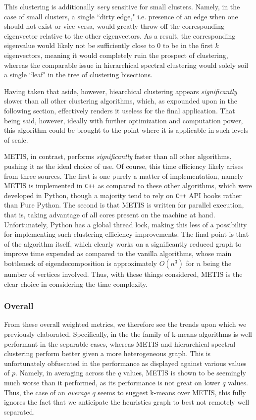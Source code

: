 \documentclass{article}
\begin{document}
This clustering is additionally \textit{very} sensitive for small clusters. Namely, in the case of small clusters, a single ``dirty edge," i.e. presence of an edge when one should not exist or vice versa, would greatly throw off the corresponding eigenvector relative to the other eigenvectors. As a result, the corresponding eigenvalue would likely not be sufficiently close to 0 to be in the first $k$ eigenvectors, meaning it would completely ruin the prospect of clustering, whereas the comparable issue in hierarchical spectral clustering would solely soil a single ``leaf" in the tree of clustering bisections.

Having taken that aside, however, hiearchical clustering appears \textit{significantly} slower than all other clustering algorithms, which, as expounded upon in the following section, effectively renders it useless for the final application. That being said, however, ideally with further optimization and computation power, this algorithm could be brought to the point where it is applicable in such levels of scale. 

METIS, in contrast, performs \textit{significantly} faster than all other algorithms, pushing it as the ideal choice of use. Of course, this time efficiency likely arises from three sources. The first is one purely a matter of implementation, namely METIS is implemented in \texttt{C++} as compared to these other algorithms, which were developed in Python, though a majority tend to rely on \texttt{C++} API hooks rather than Pure Python. The second is that METIS is written for parallel execution, that is, taking advantage of all cores present on the machine at hand. Unfortunately, Python has a global thread lock, making this less of a possibility for implementing such clustering efficiency improvements. The final point is that of the algorithm itself, which clearly works on a significantly reduced graph to improve time expended as compared to the vanilla algorithms, whose main bottleneck of eigendecomposition is approximately $O(n^3)$ for $n$ being the number of vertices involved. Thus, with these things considered, METIS is the clear choice in considering the time complexity.

\subsubsection{Overall}
From these overall weighted metrics, we therefore see the trends upon which we previously elaborated. Specifically, in the the family of k-means algorithms is well performant in the separable cases, whereas METIS and hierarchical spectral clustering perform better given a more heterogeneous graph. This is unfortunately obfuscated in the performance as displayed against various values of $p$. Namely, in averaging across the $q$ values, METIS is shown to be seemingly much worse than it performed, as its performance is not great on lower $q$ values. Thus, the case of an \textit{average} $q$ seems to suggest k-means over METIS, this fully ignores the fact that we anticipate the heuristics graph to best not remotely well separated.
\end{document}
